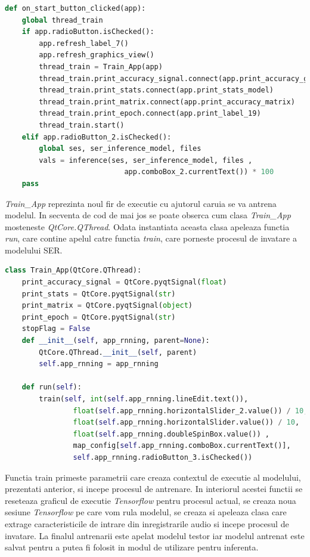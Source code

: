 \documentclass[a4paper,12pt]{book}
\begin{document}
		\begin{lstlisting}[language=Python, caption={Metoda interfetei grafice apelata automat in urma apasarii butonului Start.}, label=on_click]	
def on_start_button_clicked(app):
	global thread_train
	if app.radioButton.isChecked():
		app.refresh_label_7()
		app.refresh_graphics_view()
		thread_train = Train_App(app)
		thread_train.print_accuracy_signal.connect(app.print_accuracy_graph)
		thread_train.print_stats.connect(app.print_stats_model)
		thread_train.print_matrix.connect(app.print_accuracy_matrix)
		thread_train.print_epoch.connect(app.print_label_19)
		thread_train.start()
	elif app.radioButton_2.isChecked():
		global ses, ser_inference_model, files
		vals = inference(ses, ser_inference_model, files ,
							app.comboBox_2.currentText()) * 100
	pass \end{lstlisting}
		\textit{Train\_App} reprezinta noul fir de executie cu ajutorul caruia se va antrena modelul. In secventa de cod de mai jos se poate obserca cum clasa \textit{Train\_App} mosteneste \textit{QtCore.QThread}. Odata instantiata aceasta clasa apeleaza functia \textit{run}, care contine apelul catre functia \textit{train}, care porneste procesul de invatare a modelului SER.
		\begin{lstlisting}[language=Python, caption={Clasa aferenta firului de executie pentru procesul de antrenare.}]	
class Train_App(QtCore.QThread):
	print_accuracy_signal = QtCore.pyqtSignal(float)
	print_stats = QtCore.pyqtSignal(str)
	print_matrix = QtCore.pyqtSignal(object)
	print_epoch = QtCore.pyqtSignal(str)
	stopFlag = False
	def __init__(self, app_rnning, parent=None):
		QtCore.QThread.__init__(self, parent)
		self.app_rnning = app_rnning
		
	def run(self):
		train(self, int(self.app_rnning.lineEdit.text()),
				float(self.app_rnning.horizontalSlider_2.value()) / 10,  
				float(self.app_rnning.horizontalSlider.value()) / 10, 
				float(self.app_rnning.doubleSpinBox.value()) ,
				map_config[self.app_rnning.comboBox.currentText()], 
				self.app_rnning.radioButton_3.isChecked()) \end{lstlisting}
		Functia train primeste parametrii care creaza contextul de executie al modelului, prezentati anterior, si incepe procesul de antrenare. In interiorul acestei functii se reseteaza graficul de executie \textit{Tensorflow} pentru procesul actual, se creaza noua sesiune \textit{Tensorflow}  pe care vom rula modelul, se creaza si apeleaza clasa care extrage caracteristicile de intrare din inregistrarile audio si incepe procesul de invatare. La finalul antrenarii este apelat modelul testor iar modelul antrenat este salvat pentru a putea fi folosit in modul de utilizare pentru inferenta. \par
		
\end{document}
